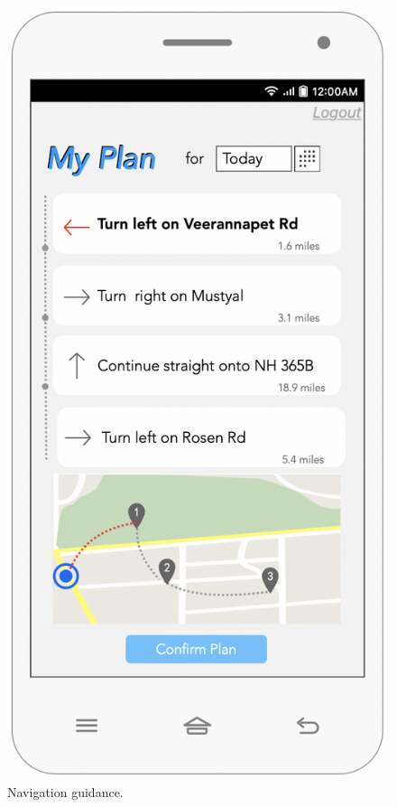 \begin{multicols}{2}
\begin{figure}[H]
\centering
\includegraphics[scale=0.5]{../images_diagrams/mock_ups/dd/Plan04_Guidance.png}
\caption{\label{fig:mockplan_guide}Navigation guidance.}
\end{figure}
\end{multicols}

